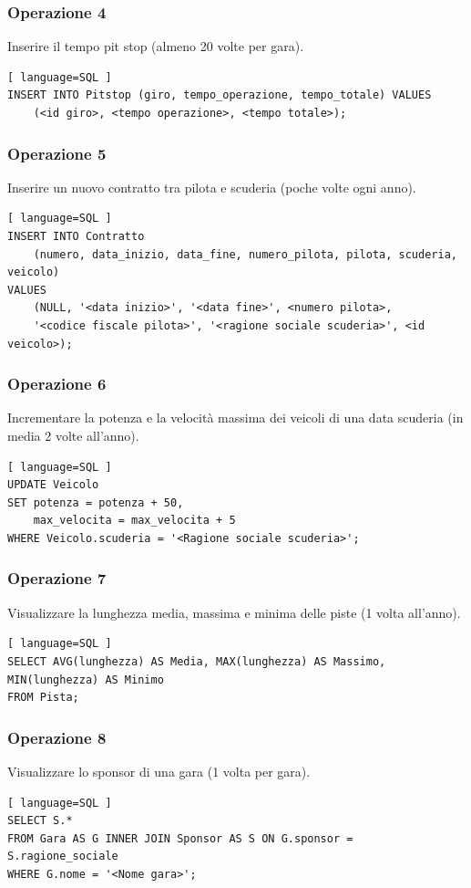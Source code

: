 \documentclass[11pt]{article}
\begin{document}
\subsubsection{Operazione 4}
Inserire il tempo pit stop (almeno 20 volte per gara).
\begin{lstlisting}[ language=SQL ]
INSERT INTO Pitstop (giro, tempo_operazione, tempo_totale) VALUES 
    (<id giro>, <tempo operazione>, <tempo totale>);
\end{lstlisting}


\subsubsection{Operazione 5}
Inserire un nuovo contratto tra pilota e scuderia (poche volte ogni anno).
\begin{lstlisting}[ language=SQL ]
INSERT INTO Contratto 
    (numero, data_inizio, data_fine, numero_pilota, pilota, scuderia, veicolo) 
VALUES 
    (NULL, '<data inizio>', '<data fine>', <numero pilota>, 
    '<codice fiscale pilota>', '<ragione sociale scuderia>', <id veicolo>);
\end{lstlisting}


\subsubsection{Operazione 6}
Incrementare la potenza e la velocità massima dei veicoli di una data scuderia (in media 2 volte all'anno).
\begin{lstlisting}[ language=SQL ]
UPDATE Veicolo
SET potenza = potenza + 50,
    max_velocita = max_velocita + 5
WHERE Veicolo.scuderia = '<Ragione sociale scuderia>';   
\end{lstlisting}


\subsubsection{Operazione 7}
Visualizzare la lunghezza media, massima e minima delle piste (1 volta all'anno).
\begin{lstlisting}[ language=SQL ]
SELECT AVG(lunghezza) AS Media, MAX(lunghezza) AS Massimo, MIN(lunghezza) AS Minimo
FROM Pista;
\end{lstlisting}


\subsubsection{Operazione 8}
Visualizzare lo sponsor di una gara (1 volta per gara).
\begin{lstlisting}[ language=SQL ]
SELECT S.*
FROM Gara AS G INNER JOIN Sponsor AS S ON G.sponsor = S.ragione_sociale
WHERE G.nome = '<Nome gara>';
\end{lstlisting}
\end{document}
